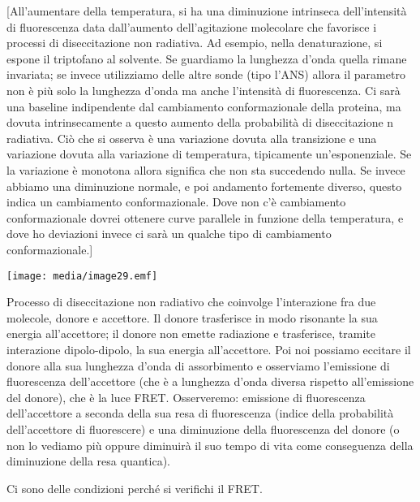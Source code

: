 {[}All'aumentare della temperatura, si ha una diminuzione intrinseca
dell'intensità di fluorescenza data dall'aumento dell'agitazione
molecolare che favorisce i processi di diseccitazione non radiativa. Ad
esempio, nella denaturazione, si espone il triptofano al solvente. Se
guardiamo la lunghezza d'onda quella rimane invariata; se invece
utilizziamo delle altre sonde (tipo l'ANS) allora il parametro non è più
solo la lunghezza d'onda ma anche l'intensità di fluorescenza. Ci sarà
una baseline indipendente dal cambiamento conformazionale della
proteina, ma dovuta intrinsecamente a questo aumento della probabilità
di diseccitazione n radiativa. Ciò che si osserva è una variazione
dovuta alla transizione e una variazione dovuta alla variazione di
temperatura, tipicamente un'esponenziale. Se la variazione è monotona
allora significa che non sta succedendo nulla. Se invece abbiamo una
diminuzione normale, e poi andamento fortemente diverso, questo indica
un cambiamento conformazionale. Dove non c'è cambiamento conformazionale
dovrei ottenere curve parallele in funzione della temperatura, e dove ho
deviazioni invece ci sarà un qualche tipo di cambiamento
conformazionale.{]}

\texttt{[image: media/image29.emf]}

Processo di diseccitazione non radiativo che coinvolge l'interazione fra
due molecole, donore e accettore. Il donore trasferisce in modo
risonante la sua energia all'accettore; il donore non emette radiazione
e trasferisce, tramite interazione dipolo-dipolo, la sua energia
all'accettore. Poi noi possiamo eccitare il donore alla sua lunghezza
d'onda di assorbimento e osserviamo l'emissione di fluorescenza
dell'accettore (che è a lunghezza d'onda diversa rispetto all'emissione
del donore), che è la luce FRET. Osserveremo: emissione di fluorescenza
dell'accettore a seconda della sua resa di fluorescenza (indice della
probabilità dell'accettore di fluorescere) e una diminuzione della
fluorescenza del donore (o non lo vediamo più oppure diminuirà il suo
tempo di vita come conseguenza della diminuzione della resa quantica).

Ci sono delle condizioni perché si verifichi il FRET.

